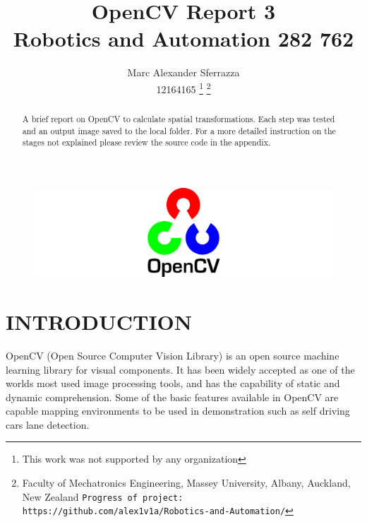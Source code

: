 \documentclass[a4paper, 10pt]{article}
\title{\LARGE \bf OpenCV Report 3\\Robotics and Automation  282 762}
\author{Marc Alexander Sferrazza \\ 12164165
\thanks{This work was not supported by any organization}
\thanks{Faculty of Mechatronics Engineering, Massey University, Albany, Auckland, New Zealand
        {\tt\small Progress of project: https://github.com/alex1v1a/Robotics-and-Automation/} } }
\begin{document}
\maketitle

\begin{figure}[H]
  \includegraphics[width=\linewidth]{images/opencv}
  \label{fig:opencv}
\end{figure}

\thispagestyle{empty}
\pagestyle{plain}



\begin{abstract}

A brief report on OpenCV to calculate spatial transformations. Each step was tested and an output image saved to the local folder. For a more detailed instruction on the stages not explained please review the source code in the appendix.

\end{abstract}


\clearpage
\tableofcontents
\listoffigures
\thispagestyle{empty}
\clearpage


\setcounter{page}{1}

\section{INTRODUCTION}

OpenCV (Open Source Computer Vision Library) is an open source machine learning library for visual components. It has been widely accepted as one of the worlds most used image processing tools, and has the capability of static and dynamic comprehension. Some of the basic features available in OpenCV are capable mapping environments to be used in demonstration such as self driving cars lane detection. 
\end{document}
